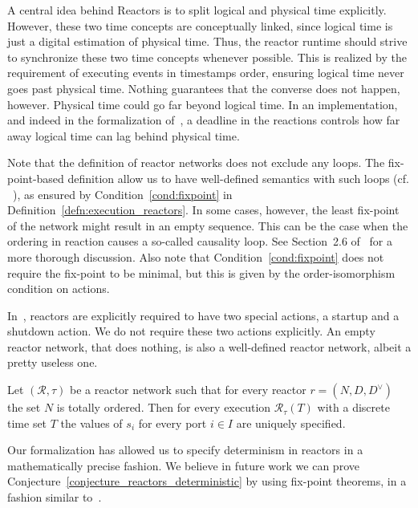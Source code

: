 A central idea behind Reactors is to split logical and physical time explicitly.
However, these two time concepts are conceptually linked, since logical time is just a digital estimation of physical time.
Thus, the reactor runtime should strive to synchronize these two time concepts whenever possible.
This is realized by the requirement of executing events in timestamps order, ensuring logical time never goes past physical time.
Nothing guarantees that the converse does not happen, however.
Physical time could go far beyond logical time.
In an implementation, and indeed in the formalization of~\cite{lohstroh_phdthesis}, a deadline in the reactions controls how far away logical time can lag behind physical time. 

Note that the definition of reactor networks does not exclude any loops.
The fix-point-based definition allow us to have well-defined semantics with such loops (cf. ~\cite{kahn74,lee_matsikoudis_semantics}),
as ensured by Condition~\ref{cond:fixpoint} in Definition~\ref{defn:execution_reactors}.
In some cases, however, the least fix-point of the network might result in an empty sequence.
This can be the case when the ordering in reaction causes a so-called causality loop.
See Section~2.6 of~\cite{lohstroh_phdthesis} for a more thorough discussion.
Also note that Condition~\ref{cond:fixpoint} does not require the fix-point to be minimal, but this is given by the order-isomorphism condition on actions.

In~\cite{lohstroh_phdthesis}, reactors are explicitly required to have two special actions, a startup and a shutdown action.
We do not require these two actions explicitly.
An empty reactor network, that does nothing, is also a well-defined reactor network, albeit a pretty useless one.

\begin{conjecture}
    \label{conjecture_reactors_deterministic}
Let $(\mathcal{R},\tau)$ be a reactor network such that for every reactor $r = (N,D,D^\vee)$ the set $N$ is totally ordered.
Then for every execution $\mathcal{R}_\tau(T)$ with a discrete time set $T$ the values of $s_i$ for every port $i \in I$ are uniquely specified.
\end{conjecture}

Our formalization has allowed us to specify determinism in reactors in a mathematically precise fashion.
We believe in future work we can prove Conjecture~\ref{conjecture_reactors_deterministic} by using fix-point theorems, in a fashion similar to~\cite{kahn74}.

